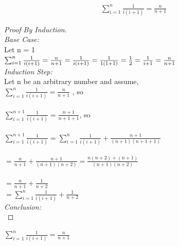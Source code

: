 \documentclass[14pt]{extarticle}
\begin{document}
\begin{align*}
\sum_{i=1}^{n} \frac{1}{i(i+1)} = \frac{n}{n+1} 
\end{align*}
\begin{proof}[Proof By Induction]\hfill \\
\emph{Base Case:}\\
Let n = 1 \\
$\sum_{i=1}^{n} \frac{1}{i(i+1)} = \frac{n}{n+1} \\ = \frac{1}{i(i+1)} = \frac{1}{1(1+1)} = \frac{1}{2} \\ = \frac{1}{i + 1} = \frac{n}{n + 1} $ \\
\emph{Induction Step:}\\
Let n be an arbitrary number and assume, \\

$\sum_{i=1}^{n} \frac{1}{i(i+1)} = \frac{n}{n + 1} $ , so \\\\
$\sum_{i=1}^{n+1} \frac{1}{i(i+1)} = \frac{n+1}{n + 1+1} $, so \\\\
$\sum_{i=1}^{n+1} \frac{1}{i(i+1)} = \sum_{i=1}^{n} \frac{1}{i(i+1)} + \frac{n+1}{(n+1)(n+1+1)}$ \\\\
$= \frac{n}{n+1} + \frac{n+1}{(n+1)(n+2)} = \frac{n(n+2) + (n+1)}{(n+1)(n+2)} $
 \\\\
 $= \frac{n}{n+1} + \frac{1}{n+2}$ \\
 $= \sum_{i=1}^{n} \frac{1}{i(i+1)} + \frac{1}{n+2}$\\
 

\emph{Conclusion:}\\
\end{proof}
$\sum_{i=1}^{n} \frac{1}{i(i+1)} = \frac{n}{n+1}$ \\
\end{document}
